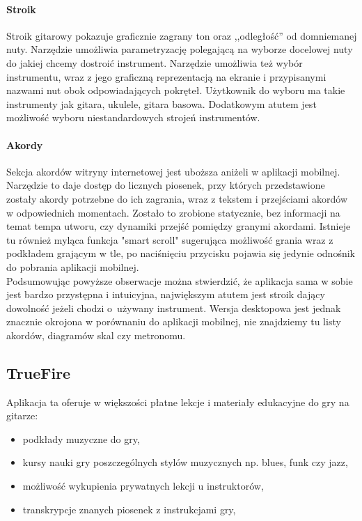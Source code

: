 \paragraph{Stroik} Stroik gitarowy pokazuje graficznie zagrany ton oraz ,,odległość'' od domniemanej nuty. Narzędzie umożliwia parametryzację polegającą na wyborze docelowej nuty do jakiej chcemy dostroić instrument. Narzędzie umożliwia też wybór instrumentu, wraz z jego graficzną reprezentacją na ekranie i przypisanymi nazwami nut obok odpowiadających pokręteł. Użytkownik do wyboru ma takie instrumenty jak gitara, ukulele, gitara basowa. Dodatkowym atutem jest możliwość wyboru niestandardowych strojeń instrumentów. 

\paragraph{Akordy} Sekcja akordów witryny internetowej jest uboższa aniżeli w aplikacji mobilnej. Narzędzie to daje dostęp do licznych piosenek, przy których przedstawione zostały akordy potrzebne do ich zagrania, wraz z tekstem i przejściami akordów w odpowiednich momentach. Zostało to zrobione statycznie, bez informacji na temat tempa utworu, czy dynamiki przejść pomiędzy granymi akordami. Istnieje tu również myląca funkcja "smart scroll" sugerująca możliwość grania wraz z podkładem grającym w tle, po naciśnięciu przycisku pojawia się jedynie odnośnik do pobrania aplikacji mobilnej.\\


Podsumowując powyższe obserwacje można stwierdzić, że aplikacja sama w sobie jest bardzo przystępna i intuicyjna, największym atutem jest stroik dający dowolność jeżeli chodzi o~używany instrument. Wersja desktopowa jest jednak znacznie okrojona w porównaniu do aplikacji mobilnej, nie znajdziemy tu listy akordów, diagramów skal czy metronomu. 

\subsection{TrueFire}
Aplikacja ta oferuje w większości płatne lekcje i materiały edukacyjne do gry na gitarze:

\begin{itemize}
    \item podkłady muzyczne do gry,
    \item kursy nauki gry poszczególnych stylów muzycznych np. blues, funk czy jazz,
    \item możliwość wykupienia prywatnych lekcji u instruktorów,
    \item transkrypcje znanych piosenek z instrukcjami gry,
\end{itemize}

